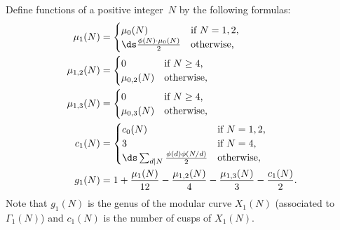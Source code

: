 Define functions of a positive integer~$N$ by the following formulas:
\begin{align*}
\mu_1(N) &= 
\begin{cases}
\mu_0(N) & \text{if $N=1,2$,}\\
\ds\frac{\phi(N)\cdot \mu_0(N)}{2} & \text{otherwise,}
\end{cases} \\
\mu_{1,2}(N) &= \begin{cases}
    0 & \text{if $N\geq 4$,}\\
  \mu_{0,2}(N) & \text{otherwise,}
\end{cases}\\
\mu_{1,3}(N) &= \begin{cases}
    0 & \text{if $N\geq 4$,}\\
    \mu_{0,3}(N) & \text{otherwise,}
\end{cases}\\
c_1(N) &= 
\begin{cases}
  c_0(N) & \text{if $N=1,2$,}\\
  3      & \text{if $N=4$,}\\
  \ds \sum_{d \mid N} \frac{\phi(d)\phi(N/d)}{2} & \text{otherwise},
\end{cases} \\
g_1(N) &= 1 + \frac{\mu_1(N)}{12} - \frac{\mu_{1,2}(N)}{4} - \frac{\mu_{1,3}(N)}{3}
            - \frac{c_1(N)}{2}.
\end{align*}
Note that $g_1(N)$ is the genus of the modular curve $X_1(N)$ (associated
to $\Gamma_1(N)$) and $c_1(N)$ is the number of cusps of $X_1(N)$.

